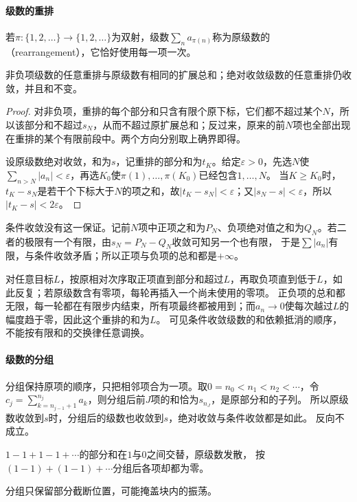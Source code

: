 \paragraph{级数的重排}
若$\pi:\{1,2,\ldots\}\to\{1,2,\ldots\}$为双射，级数$\sum_na_{\pi(n)}$称为原级数的（rearrangement），它恰好使用每一项一次。
\begin{theorem}[保持和的重排]
\label{thm:ru-rearrangement}
非负项级数的任意重排与原级数有相同的扩展总和；绝对收敛级数的任意重排仍收敛，并且和不变。
\end{theorem}
\begin{proof}
对非负项，重排的每个部分和只含有限个原下标，它们都不超过某个$N$，所以该部分和不超过$s_N$，从而不超过原扩展总和；反过来，原来的前$N$项也全部出现在重排的某个有限前段中。两个方向分别取上确界即得。

设原级数绝对收敛，和为$s$，记重排的部分和为$t_K$。给定$\varepsilon>0$，先选$N$使$\sum_{n>N}|a_n|<\varepsilon$，再选$K_0$使$\pi(1),\ldots,\pi(K_0)$已经包含$1,\ldots,N$。
当$K\geq K_0$时，$t_K-s_N$是若干个下标大于$N$的项之和，故$|t_K-s_N|<\varepsilon$；又$|s_N-s|<\varepsilon$，所以$|t_K-s|<2\varepsilon$。
\end{proof}

条件收敛没有这一保证。记前$N$项中正项之和为$P_N$、负项绝对值之和为$Q_N$。若二者的极限有一个有限，由$s_N=P_N-Q_N$收敛可知另一个也有限，
于是$\sum|a_n|$有限，与条件收敛矛盾；所以正项与负项的总和都是$+\infty$。

对任意目标$L$，按原相对次序取正项直到部分和超过$L$，再取负项直到低于$L$，如此反复；若原级数含有零项，每轮再插入一个尚未使用的零项。
正负项的总和都无限，每一轮都在有限步内结束，所有项最终都被用到；而$a_n\to0$使每次越过$L$的幅度趋于零，因此这个重排的和为$L$。
可见条件收敛级数的和依赖抵消的顺序，不能按有限和的交换律任意调换。

\paragraph{级数的分组}
分组保持原项的顺序，只把相邻项合为一项。取$0=n_0<n_1<n_2<\cdots$，令$c_j=\sum_{k=n_{j-1}+1}^{n_j}a_k$，则分组后前$J$项的和恰为$s_{n_J}$，是原部分和的子列。
所以原级数收敛到$s$时，分组后的级数也收敛到$s$，绝对收敛与条件收敛都是如此。
反向不成立。
\begin{example}[分组后收敛而原级数发散]
\label{ex:ru-grouping-hides-divergence}
$1-1+1-1+\cdots$的部分和在$1$与$0$之间交替，原级数发散，
按$(1-1)+(1-1)+\cdots$分组后各项却都为零。
\end{example}
分组只保留部分截断位置，可能掩盖块内的振荡。


